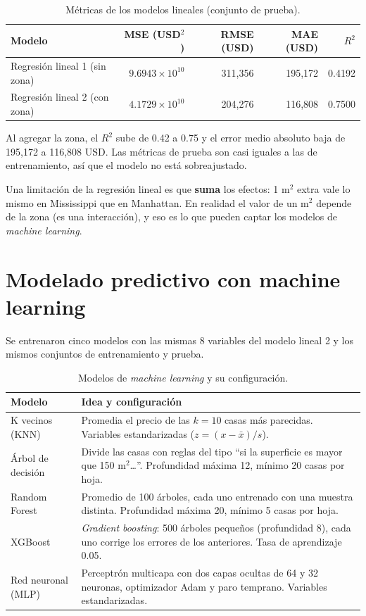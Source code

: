 \documentclass[12pt,letterpaper]{article}
\begin{document}
\begin{table}[H]
\centering
\caption{Métricas de los modelos lineales (conjunto de prueba).}
\small
\begin{tabular}{lrrrr}
\toprule
Modelo & MSE (USD$^2$) & RMSE (USD) & MAE (USD) & $R^2$ \\
\midrule
Regresión lineal 1 (sin zona) & $9.6943\times10^{10}$ & 311,356 & 195,172 & 0.4192 \\
Regresión lineal 2 (con zona) & $4.1729\times10^{10}$ & 204,276 & 116,808 & 0.7500 \\
\bottomrule
\end{tabular}
\end{table}

Al agregar la zona, el $R^2$ sube de 0.42 a 0.75 y el error medio absoluto baja de 195,172 a 116,808 USD. Las métricas de prueba son casi iguales a las de entrenamiento, así que el modelo no está sobreajustado.

Una limitación de la regresión lineal es que \textbf{suma} los efectos: 1 m$^2$ extra vale lo mismo en Mississippi que en Manhattan. En realidad el valor de un m$^2$ depende de la zona (es una interacción), y eso es lo que pueden captar los modelos de \emph{machine learning}.

\section{Modelado predictivo con machine learning}

Se entrenaron cinco modelos con las mismas 8 variables del modelo lineal 2 y los mismos conjuntos de entrenamiento y prueba.

\begin{table}[H]
\centering
\caption{Modelos de \emph{machine learning} y su configuración.}
\small
\begin{tabular}{p{3.6cm}p{11.2cm}}
\toprule
Modelo & Idea y configuración \\
\midrule
K vecinos (KNN) & Promedia el precio de las $k = 10$ casas más parecidas. Variables estandarizadas ($z = (x - \bar{x})/s$). \\
Árbol de decisión & Divide las casas con reglas del tipo ``si la superficie es mayor que 150 m$^2$\dots''. Profundidad máxima 12, mínimo 20 casas por hoja. \\
Random Forest & Promedio de 100 árboles, cada uno entrenado con una muestra distinta. Profundidad máxima 20, mínimo 5 casas por hoja. \\
XGBoost & \emph{Gradient boosting}: 500 árboles pequeños (profundidad 8), cada uno corrige los errores de los anteriores. Tasa de aprendizaje 0.05. \\
Red neuronal (MLP) & Perceptrón multicapa con dos capas ocultas de 64 y 32 neuronas, optimizador Adam y paro temprano. Variables estandarizadas. \\
\bottomrule
\end{tabular}
\end{table}
\end{document}
